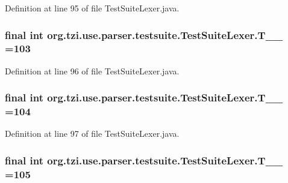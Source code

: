 Definition at line 95 of file Test\-Suite\-Lexer.\-java.

\hypertarget{classorg_1_1tzi_1_1use_1_1parser_1_1testsuite_1_1_test_suite_lexer_a826f1096270f70ba8c3218ef523fa37f}{
\subsubsection[{T\-\_\-\-\_\-103}]{\setlength{\rightskip}{0pt plus 5cm}final int org.\-tzi.\-use.\-parser.\-testsuite.\-Test\-Suite\-Lexer.\-T\-\_\-\-\_ =103\hspace{0.3cm}{\ttfamily [static]}}}\label{classorg_1_1tzi_1_1use_1_1parser_1_1testsuite_1_1_test_suite_lexer_a826f1096270f70ba8c3218ef523fa37f}


Definition at line 96 of file Test\-Suite\-Lexer.\-java.

\hypertarget{classorg_1_1tzi_1_1use_1_1parser_1_1testsuite_1_1_test_suite_lexer_a30a0f50465189bace483f4f3eefb54b1}{
\subsubsection[{T\-\_\-\-\_\-104}]{\setlength{\rightskip}{0pt plus 5cm}final int org.\-tzi.\-use.\-parser.\-testsuite.\-Test\-Suite\-Lexer.\-T\-\_\-\-\_ =104\hspace{0.3cm}{\ttfamily [static]}}}\label{classorg_1_1tzi_1_1use_1_1parser_1_1testsuite_1_1_test_suite_lexer_a30a0f50465189bace483f4f3eefb54b1}


Definition at line 97 of file Test\-Suite\-Lexer.\-java.

\hypertarget{classorg_1_1tzi_1_1use_1_1parser_1_1testsuite_1_1_test_suite_lexer_ac04ebaaf2a4e99d0b26ec0aae8b1c0e7}{
\subsubsection[{T\-\_\-\-\_\-105}]{\setlength{\rightskip}{0pt plus 5cm}final int org.\-tzi.\-use.\-parser.\-testsuite.\-Test\-Suite\-Lexer.\-T\-\_\-\-\_ =105\hspace{0.3cm}{\ttfamily [static]}}}\label{classorg_1_1tzi_1_1use_1_1parser_1_1testsuite_1_1_test_suite_lexer_ac04ebaaf2a4e99d0b26ec0aae8b1c0e7}



